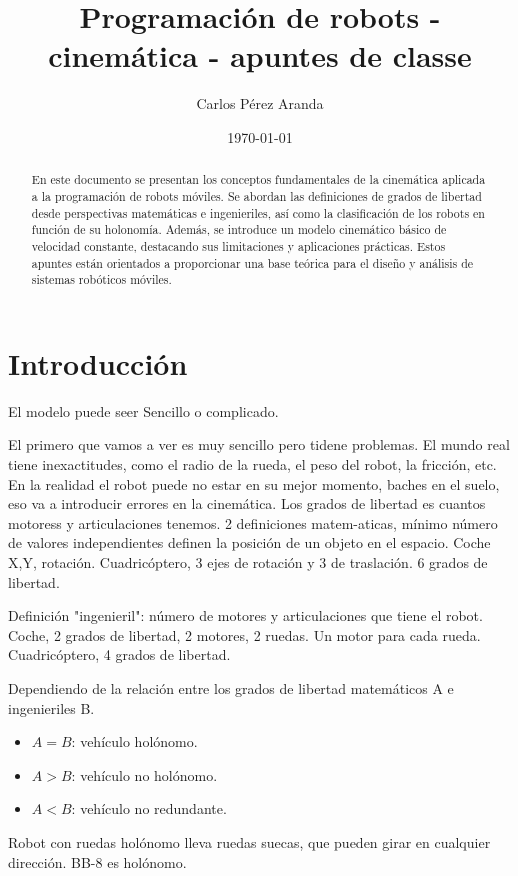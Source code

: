 \documentclass[a4paper]{article}
\title{Programación de robots - cinemática - apuntes de classe}
\author{Carlos Pérez Aranda}
\date{\today}
\begin{document}
\maketitle

\begin{abstract}
En este documento se presentan los conceptos fundamentales de la cinemática aplicada a la programación de robots móviles.
Se abordan las definiciones de grados de libertad desde perspectivas matemáticas e ingenieriles, 
así como la clasificación de los robots en función de su holonomía. Además, se introduce un modelo 
cinemático básico de velocidad constante, destacando sus limitaciones y aplicaciones prácticas. Estos apuntes 
están orientados a proporcionar una base teórica para el diseño y análisis de sistemas robóticos móviles.
\end{abstract}

\section{Introducción}
El modelo puede seer Sencillo o complicado.

El primero que vamos a ver es muy sencillo pero tidene problemas.
El mundo real tiene inexactitudes, como el radio de la rueda, el peso del robot, la fricción, etc. En la realidad el robot
puede no estar en su mejor momento, baches en el suelo, eso va a introducir errores en la cinemática.
Los grados de libertad es cuantos motoress y articulaciones tenemos.
2 definiciones matem-aticas, mínimo número de valores independientes definen la posición de un objeto en el espacio. Coche X,Y, rotación.
Cuadricóptero, 3 ejes de rotación y 3 de traslación. 6 grados de libertad.

Definición "ingenieril": número de motores y articulaciones que tiene el robot.
Coche, 2 grados de libertad, 2 motores, 2 ruedas. Un motor para cada rueda.
Cuadricóptero, 4 grados de libertad.

Dependiendo de la relación entre los grados de libertad matemáticos A e ingenieriles B.
\begin{itemize}
    \item $A = B$: vehículo holónomo.
    \item $A > B$: vehículo no holónomo.
    \item $A < B$: vehículo no redundante.
\end{itemize}

Robot con ruedas holónomo lleva ruedas suecas, que pueden girar en cualquier dirección. BB-8 es holónomo.
\end{document}
